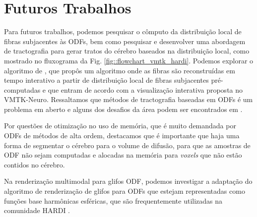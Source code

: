 \documentclass[
    12pt,                %
    oneside,            %
    a4paper,            %
    english,            %
    french,                %
    spanish,            %
    brazil                %
    ]{abntex2}
\begin{document}
\section{Futuros Trabalhos}

Para futuros trabalhos, podemos pesquisar o cômputo da distribuição local de fibras subjacentes às ODFs, bem como pesquisar e desenvolver uma abordagem de tractografia para gerar tratos do cérebro baseados na distribuição local, como mostrado no fluxograma da Fig. \ref{fig::flowchart_vmtk_hardi}. Podemos explorar o algoritmo de , que propôs um algoritmo onde as fibras são reconstruídas em tempo interativo a partir de distribuição local de fibras subjacentes pré-computadas e que entram de acordo com a visualização interativa proposta no VMTK-Neuro. Ressaltamos que métodos de tractografia baseadas em ODFs é um problema em aberto e alguns dos desafios da área podem ser encontrados em .

Por questões de otimização no uso de memória, que é muito demandada por ODFs de métodos de alta ordem, destacamos que é importante que haja uma forma de segmentar o cérebro para o volume de difusão, para que as amostras de ODF não sejam computadas e alocadas na memória para \textit{voxels} que não estão contidos no cérebro.

Na renderização multimodal para glifos ODF, podemos investigar a adaptação do algoritmo de renderização de glifos para ODFs que estejam representadas como funções base harmônicas esféricas, que são frequentemente utilizadas na comunidade HARDI \cite{descoteaux2007_QBI, Tournier2004DirectEO}.




\end{document}
